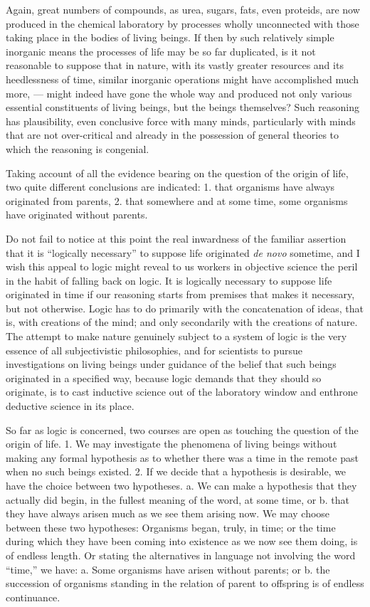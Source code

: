 \documentclass[a4paper, 11pt, oneside, polutonikogreek, english]{article}
\begin{document}
Again, great numbers of compounds, as urea, sugars, fats, even proteids, are now produced in the chemical laboratory by processes wholly unconnected with those taking place in the bodies of living beings. If then by such relatively simple inorganic means the processes of life may be so far duplicated, is it not reasonable to suppose that in nature, with its vastly greater resources and its heedlessness of time, similar inorganic operations might have accomplished much more, --- might indeed have gone the whole way and produced not only various essential constituents of living beings, but the beings themselves? Such reasoning has plausibility, even conclusive force with many minds, particularly with minds that are not over-critical and already in the possession of general theories to which the reasoning is congenial.

Taking account of all the evidence bearing on the question of the origin of life, two quite different conclusions are indicated: 1. that organisms have always originated from parents, 2. that somewhere and at some time, some organisms have originated without parents.

Do not fail to notice at this point the real inwardness of the familiar assertion that it is ``logically necessary'' to suppose life originated \emph{de novo} sometime, and I wish this appeal to logic might reveal to us workers in objective science the peril in the habit of falling back on logic. It is logically necessary to suppose life originated in time if our reasoning starts from premises that makes it necessary, but not otherwise. Logic has to do primarily with the concatenation of ideas, that is, with creations of the mind; and only secondarily with the creations of nature. The attempt to make nature genuinely subject to a system of logic is the very essence of all subjectivistic philosophies, and for scientists to pursue investigations on living beings under guidance of the belief that such beings originated in a specified way, because logic demands that they should so originate, is to cast inductive science out of the laboratory window and enthrone deductive science in its place.

So far as logic is concerned, two courses are open as touching the question of the origin of life. 1. We may investigate the phenomena of living beings without making any formal hypothesis as to whether there was a time in the remote past when no such beings existed. 2. If we decide that a hypothesis is desirable, we have the choice between two hypotheses. a. We can make a hypothesis that they actually did begin, in the fullest meaning of the word, at some time, or b. that they have always arisen much as we see them arising now. We may choose between these two hypotheses: Organisms began, truly, in time; or the time during which they have been coming into existence as we now see them doing, is of endless length. Or stating the alternatives in language not involving the word ``time,'' we have: a. Some organisms have arisen without parents; or b. the succession of organisms standing in the relation of parent to offspring is of endless continuance.
\end{document}
